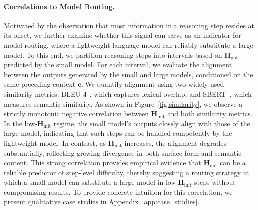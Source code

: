 \documentclass[11pt]{article}
\newcommand{\todoc}[2]{{\textcolor{#1}{{[#2]}}}}
\newcommand{\todoviolet}[1]{\todoc{violet}{\textbf{#1}}}
\newcommand{\zeng}[1]{\textcolor[rgb]{1,0.66,0}{\textbf{[Zeng: #1]}}}
\newcommand{\shi}[1]{\todoviolet{Shi: #1}}
\begin{document}
\paragraph{Correlations to Model Routing.}
Motivated by the observation that most information in a reasoning step resides at its onset, we further examine whether this signal can serve as an indicator for model routing, where a lightweight language model can reliably substitute a large model. To this end, we partition reasoning steps into intervals based on $\mathbf{H}_\text{init}$ predicted by the small model. For each interval, we evaluate the alignment between the outputs generated by the small and large models, conditioned on the same preceding context \(\mathbf{c}\). We quantify alignment using two widely used similarity metrics: BLEU-4~\cite{lin2004orange}, which captures lexical overlap, and SBERT~\cite{reimers-2019-sentence-bert}, which measures semantic similarity. %
As shown in Figure~\ref{fig:similarity}, we observe a strictly monotonic negative correlation between $\mathbf{H}_\text{init}$ and both similarity metrics. In the low-$\mathbf{H}_\text{init}$ regime, the small model’s outputs closely align with those of the large model, indicating that such steps can be handled competently by the lightweight model. In contrast, as $\mathbf{H}_\text{init}$ increases, the alignment degrades substantially, reflecting growing divergence in both surface form and semantic content. This strong correlation provides empirical evidence that $\mathbf{H}_\text{init}$ can be a reliable predictor of step-level difficulty, thereby suggesting a routing strategy in which a small model can substitute a large model in low-$\mathbf{H}_\text{init}$ steps without compromising results.
To provide concrete intuition for this correlation, we present qualitative case studies in Appendix~\ref{app:case_studies}.


\end{document}
